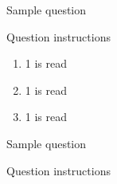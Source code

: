 \documentclass[11pt]{exam}
\begin{document}
\begin{questions}
\begin{framed}
	\end{framed}


	\question Sample question

	Question instructions

	\begin{framed}


	\end{framed}

        \begin{enumerate}[label=(\roman*)]
            \item 1 is read
                \begin{framed}
                \end{framed}
            \item 1 is read
                \begin{framed}
                \end{framed}
            \item 1 is read
                \begin{framed}
                \end{framed}
        \end{enumerate}


	\question Sample question


	\quad

	Question instructions

	\begin{framed}


	\end{framed}

\end{questions}
\end{document}
